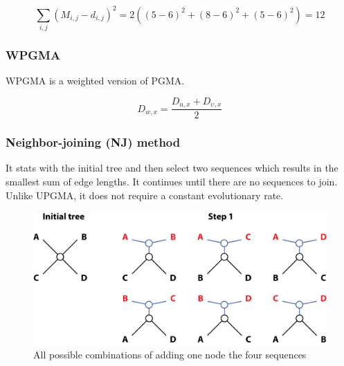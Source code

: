 \[
\sum_{i,j}{}(M_{i,j} - d_{i,j})^2 = 2((5-6)^2 + (8-6)^2 + (5-6)^2) =12
\]

%
%
\subsubsection*{WPGMA}
WPGMA is a weighted version of PGMA.

\[
D_{w,x}=\dfrac{D_{u,x} + D_{\upsilon,x}}{2}
\]

%
%
\subsubsection*{Neighbor-joining (NJ) method}
It stats with the initial tree and then select two sequences which results in the smallest sum of edge lengths. It continues until there are no sequences to join. Unlike UPGMA, it does not require a constant evolutionary rate.

\begin{figure}[H]
  \centering
      \includegraphics[width=0.75 \textwidth]{fig09/neighbor_joining.png}
  \caption{All possible combinations of adding one node the four sequences}
\end{figure}

%
%
